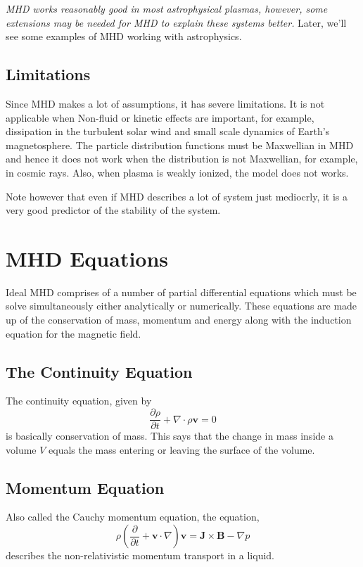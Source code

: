 \documentclass[12pt]{article}
\newenvironment{changemargin}[2]{%
\begin{list}{}{%
\setlength{\topsep}{0pt}%
\setlength{\leftmargin}{#1}%
\setlength{\rightmargin}{#2}%
\setlength{\listparindent}{\parindent}%
\setlength{\itemindent}{\parindent}%
\setlength{\parsep}{\parskip}%
}%
\item[]}{\end{list}}
\begin{document}
\begin{changemargin}{-2cm}{-2cm}
    \textit{MHD works reasonably good in most
        astrophysical plasmas, however, some extensions may be needed for MHD to explain these systems better.}
    Later, we'll see some examples of MHD working with astrophysics.

    \subsection{Limitations}
    Since MHD makes a lot of assumptions, it has severe limitations. It is not applicable when Non-fluid or kinetic effects are important, for example, dissipation in the turbulent solar wind and small scale dynamics of Earth's magnetosphere. The particle distribution functions must be Maxwellian in MHD and hence it does not work when the distribution is not Maxwellian, for example, in cosmic rays. Also, when plasma is weakly ionized, the model does not works.

    Note however that even if MHD describes a lot of system just mediocrly, it is a very good predictor of the stability of the system.

    \section{MHD Equations}
    Ideal MHD comprises of a number of partial differential equations which must be solve simultaneously either analytically or numerically. These equations are made up of the conservation of mass, momentum and energy along with the induction equation for the magnetic field.\cite{article2}

    \subsection{The Continuity Equation}
    The continuity equation, given by
    \begin{equation}\label{eq:continuity}
        \frac{\partial \rho}{\partial t}  +\nabla \cdot \rho \mathbf{v} = 0
    \end{equation}
    is basically conservation of mass. This says that the change in mass inside a volume $V$ equals the mass entering or leaving the surface of the volume.

    \subsection{Momentum Equation}
    Also called the Cauchy momentum equation, the equation,
    \begin{equation}\label{eq:momentum}
        \rho \left({\frac {\partial }{\partial t}}+\mathbf {v} \cdot \nabla \right)\mathbf {v} =\mathbf {J} \times \mathbf {B} -\nabla p
    \end{equation}
    describes the non-relativistic momentum transport in a liquid.\cite
    {wiki-momentum}


\end{changemargin}
\end{document}
